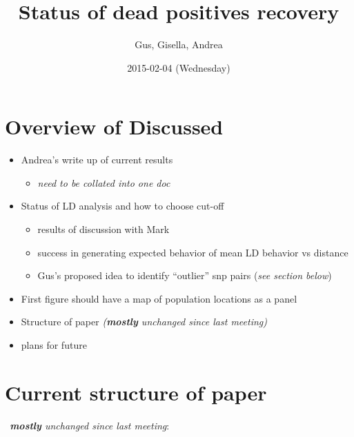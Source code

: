 \documentclass[letterpaper]{scrartcl}
\title{Status of dead positives recovery\\\vspace{0.5em}{\large Meeting notes}}
\author{Gus, Gisella, Andrea}
\date{2015-02-04 (Wednesday)}
\begin{document}
\maketitle

{
\hypersetup{linkcolor=black}
\setcounter{tocdepth}{3}
\tableofcontents
}
\section{Overview of Discussed}\label{overview-of-discussed}

\begin{itemize}
\itemsep1pt\parskip0pt
\item
  Andrea's write up of current results

  \begin{itemize}
  \itemsep1pt\parskip0pt
  \item
    \emph{need to be collated into one doc}
  \end{itemize}
\item
  Status of LD analysis and how to choose cut-off

  \begin{itemize}
  \itemsep1pt\parskip0pt
  \item
    results of discussion with Mark
  \item
    success in generating expected behavior of mean LD behavior vs
    distance
  \item
    Gus's proposed idea to identify ``outlier'' snp pairs (\emph{see
    section below})
  \end{itemize}
\item
  First figure should have a map of population locations as a panel
\item
  Structure of paper \emph{(\textbf{mostly} unchanged since last
  meeting)}
\item
  plans for future
\end{itemize}

\section{Current structure of paper}\label{current-structure-of-paper}

\emph{~\textbf{mostly} unchanged since last meeting}:
\end{document}

